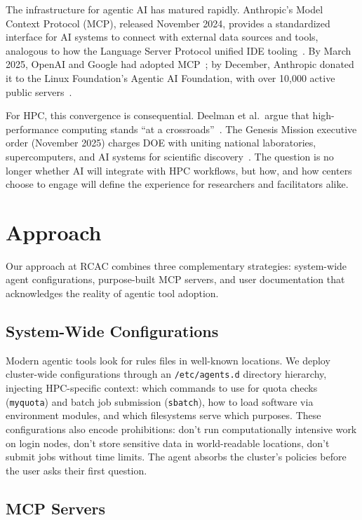 \documentclass[sigconf]{acmart}
\begin{document}
The infrastructure for agentic AI has matured rapidly. Anthropic's Model Context Protocol
(MCP), released November 2024, provides a standardized interface for AI systems to connect
with external data sources and tools, analogous to how the Language Server Protocol
unified IDE tooling~\cite{anthropic2024mcp}. By March 2025, OpenAI and Google had adopted
MCP~\cite{openai2025mcp}; by December, Anthropic donated it to the Linux Foundation's
Agentic AI Foundation, with over 10,000 active public servers~\cite{anthropic2025aaif}.

For HPC, this convergence is consequential. Deelman et al.\ argue that high-performance
computing stands ``at a crossroads''~\cite{deelman2025hpc}. The Genesis Mission executive
order (November 2025) charges DOE with uniting national laboratories, supercomputers, and
AI systems for scientific discovery~\cite{whitehouse2025genesis}. The question is no
longer whether AI will integrate with HPC workflows, but how, and how centers choose to
engage will define the experience for researchers and facilitators alike.

\section{Approach}

Our approach at RCAC combines three complementary strategies: system-wide agent
configurations, purpose-built MCP servers, and user documentation that acknowledges
the reality of agentic tool adoption.

\subsection{System-Wide Configurations}

Modern agentic tools look for rules files in well-known
locations. We deploy cluster-wide configurations through an \texttt{/etc/agents.d}
directory hierarchy, injecting HPC-specific context: which commands to use for quota
checks (\texttt{myquota}) and batch job submission (\texttt{sbatch}), how to load
software via environment modules, and which filesystems serve which purposes. These
configurations also encode prohibitions: don't run computationally intensive work on
login nodes, don't store sensitive data in world-readable locations, don't submit jobs
without time limits. The agent absorbs the cluster's policies before the user asks
their first question.

\subsection{MCP Servers}
\end{document}
